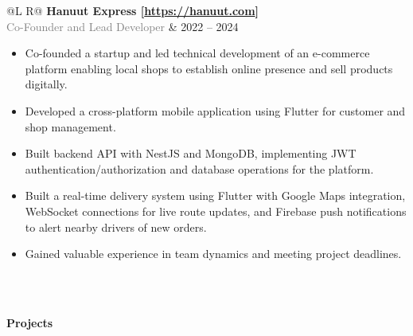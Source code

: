 \documentclass[a4paper,portrait]{article}
\newcommand{\lighttext}[1]{\textcolor{gray}{#1}}
\begin{document}
\begin{tabularx}{\textwidth}{@{}L R@{}}
  \textbf{Hanuut Express [\url{https://hanuut.com}]}\\
  \lighttext{Co-Founder and Lead Developer} & 2022 -- 2024\\[0.2cm]

  \begin{minipage}[t]{\linewidth}
    \begin{itemize}[noitemsep,topsep=0pt,parsep=0pt,partopsep=0pt]
      \item Co-founded a startup and led technical development of an e-commerce platform enabling local shops to establish online presence and sell products digitally.
      \item Developed a cross-platform mobile application using Flutter for customer and shop management.
      \item Built backend API with NestJS and MongoDB, implementing JWT authentication/authorization and database operations for the platform.
      \item Built a real-time delivery system using Flutter with Google Maps integration, WebSocket connections for live route updates, and Firebase push notifications to alert nearby drivers of new orders.
      \item Gained valuable experience in team dynamics and meeting project deadlines.
    \end{itemize}
  \end{minipage}\\\\
\end{tabularx}





\begin{minipage}[t]{\linewidth}
  \textbf{Projects}
\end{minipage}
\end{document}
